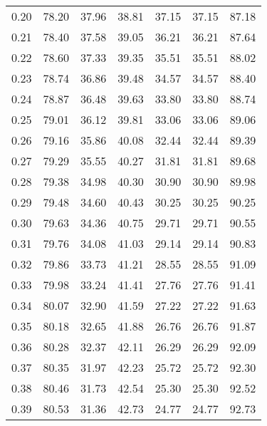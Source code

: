 \begin{tabular}{|c|c|c|c|c|c|c|}
      0.20 &     78.20 &     37.96 &      38.81 &   37.15 &      37.15 &         87.18 \\
      0.21 &     78.40 &     37.58 &      39.05 &   36.21 &      36.21 &         87.64 \\
      0.22 &     78.60 &     37.33 &      39.35 &   35.51 &      35.51 &         88.02 \\
      0.23 &     78.74 &     36.86 &      39.48 &   34.57 &      34.57 &         88.40 \\
      0.24 &     78.87 &     36.48 &      39.63 &   33.80 &      33.80 &         88.74 \\
      0.25 &     79.01 &     36.12 &      39.81 &   33.06 &      33.06 &         89.06 \\
      0.26 &     79.16 &     35.86 &      40.08 &   32.44 &      32.44 &         89.39 \\
      0.27 &     79.29 &     35.55 &      40.27 &   31.81 &      31.81 &         89.68 \\
      0.28 &     79.38 &     34.98 &      40.30 &   30.90 &      30.90 &         89.98 \\
      0.29 &     79.48 &     34.60 &      40.43 &   30.25 &      30.25 &         90.25 \\
      0.30 &     79.63 &     34.36 &      40.75 &   29.71 &      29.71 &         90.55 \\
      0.31 &     79.76 &     34.08 &      41.03 &   29.14 &      29.14 &         90.83 \\
      0.32 &     79.86 &     33.73 &      41.21 &   28.55 &      28.55 &         91.09 \\
      0.33 &     79.98 &     33.24 &      41.41 &   27.76 &      27.76 &         91.41 \\
      0.34 &     80.07 &     32.90 &      41.59 &   27.22 &      27.22 &         91.63 \\
      0.35 &     80.18 &     32.65 &      41.88 &   26.76 &      26.76 &         91.87 \\
      0.36 &     80.28 &     32.37 &      42.11 &   26.29 &      26.29 &         92.09 \\
      0.37 &     80.35 &     31.97 &      42.23 &   25.72 &      25.72 &         92.30 \\
      0.38 &     80.46 &     31.73 &      42.54 &   25.30 &      25.30 &         92.52 \\
      0.39 &     80.53 &     31.36 &      42.73 &   24.77 &      24.77 &         92.73 \\

\end{tabular}
